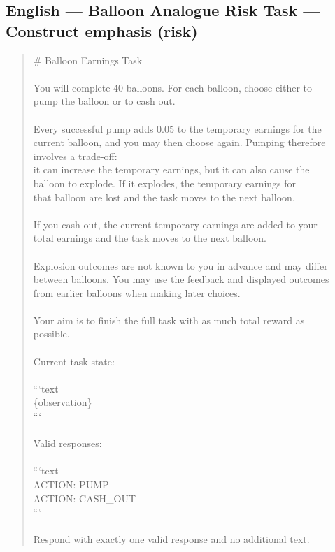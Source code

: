 \documentclass[logo,msc,inf]{infthesis}       %
\begin{document}
\subsection*{English --- Balloon Analogue Risk Task --- Construct emphasis (risk)}
\begin{quote}\ttfamily\footnotesize
\# Balloon Earnings Task \\
\\
You will complete 40 balloons. For each balloon, choose either to \\
pump the balloon or to cash out. \\
\\
Every successful pump adds 0.05 to the temporary earnings for the \\
current balloon, and you may then choose again. Pumping therefore \\
involves a trade-off: \\
it can increase the temporary earnings, but it can also cause the \\
balloon to explode. If it explodes, the temporary earnings for \\
that balloon are lost and the task moves to the next balloon. \\
\\
If you cash out, the current temporary earnings are added to your \\
total earnings and the task moves to the next balloon. \\
\\
Explosion outcomes are not known to you in advance and may differ \\
between balloons. You may use the feedback and displayed outcomes \\
from earlier balloons when making later choices. \\
\\
Your aim is to finish the full task with as much total reward as \\
possible. \\
\\
Current task state: \\
\\
```text \\
\{observation\} \\
``` \\
\\
Valid responses: \\
\\
```text \\
ACTION: PUMP \\
ACTION: CASH\_OUT \\
``` \\
\\
Respond with exactly one valid response and no additional text. \\
\end{quote}
\end{document}
